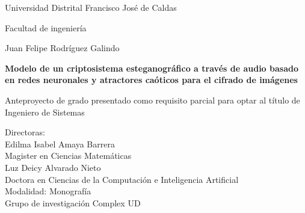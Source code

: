 \documentclass[12pt,a4paper]{report}
\begin{document}
  \pagestyle{empty}
  \begin{center}

    \large
    Universidad Distrital Francisco Jos\'e de Caldas
    
    \medskip
    Facultad de ingeniería

    \vfill
    \vspace{5mm}
    {\large Juan Felipe Rodríguez Galindo}

    \vspace{15mm}
    {\large\bfseries Modelo de un criptosistema esteganogr\'afico a través de audio basado en redes neuronales y atractores ca\'oticos para el cifrado de im\'agenes}

    \vfill
    Anteproyecto de grado presentado como requisito parcial para optar al título de Ingeniero de Sistemas

    \vfill
    Directoras: \\
    \vspace{5mm}
    Edilma Isabel Amaya Barrera\\
    Magister en Ciencias Matemáticas\\
    \vspace{3mm}
    Luz Deicy Alvarado Nieto\\
    Doctora en Ciencias de la Computación e Inteligencia Artificial\\
    \vfill
    Modalidad:  Monografía \\
    \vfill
    Grupo de investigación Complex UD \\

    \vfill
    \date{\today}
  \end{center}

  \newpage

  \pagestyle{plain}
  \setcounter{page}{1}
  \tableofcontents{}

  
  
  
  
  
  
  
  
  
  
  
  
\end{document}
